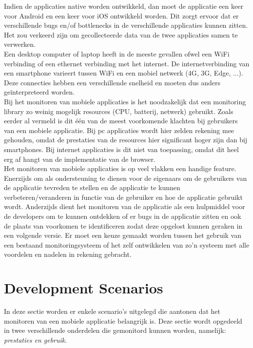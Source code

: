 Indien de applicaties native worden ontwikkeld, dan moet de applicatie een keer voor Android en een keer voor iOS ontwikkeld worden. Dit zorgt ervoor dat er verschillende bugs en/of bottlenecks in de verschillende applicaties kunnen zitten. Het zou verkeerd zijn om gecollecteerde data van de twee applicaties samen te verwerken. \\
Een desktop computer of laptop heeft in de meeste gevallen ofwel een WiFi verbinding of een ethernet verbinding met het internet. De internetverbinding van een smartphone varieert tussen WiFi en een mobiel netwerk (4G, 3G, Edge, ...). Deze connecties hebben een verschillende snelheid en moeten dus anders ge\"interpreteerd worden. \\

Bij het monitoren van mobiele applicaties is het noodzakelijk dat een monitoring library zo weinig mogelijk resources (CPU, batterij, netwerk) gebruikt. Zoals eerder al vermeld is dit \'e\'en van de meest voorkomende klachten bij gebruikers van een mobiele applicatie. Bij pc applicaties wordt hier zelden rekening mee gehouden, omdat de prestaties van de resources hier significant hoger zijn dan bij smartphones. Bij internet applicaties is dit niet van toepassing, omdat dit heel erg af hangt van de implementatie van de browser. \\


Het monitoren van mobiele applicaties is op veel vlakken een handige feature. Enerzijds om als ondersteuning te dienen voor de eigenaars om de gebruikers van de applicatie tevreden te stellen en de applicatie te kunnen verbeteren/veranderen in functie van de gebruiker en hoe de applicatie gebruikt wordt. Anderzijds dient het monitoren van de applicatie als een hulpmiddel voor de developers om te kunnen ontdekken of er bugs in de applicatie zitten en ook de plaats van voorkomen te identificeren zodat deze opgelost kunnen geraken in een volgende versie. Er moet een keuze gemaakt worden tussen het gebruik van een bestaand monitoringsysteem of het zelf ontwikkelen van zo'n systeem met alle voordelen en nadelen in rekening gebracht. \\


\section{Development Scenarios}
In deze sectie worden er enkele scenario's uitgelegd die aantonen dat het monitoren van een mobiele applicatie belangrijk is. Deze sectie wordt opgedeeld in twee verschillende onderdelen die gemonitord kunnen worden, namelijk: \textit{prestaties en gebruik}.

